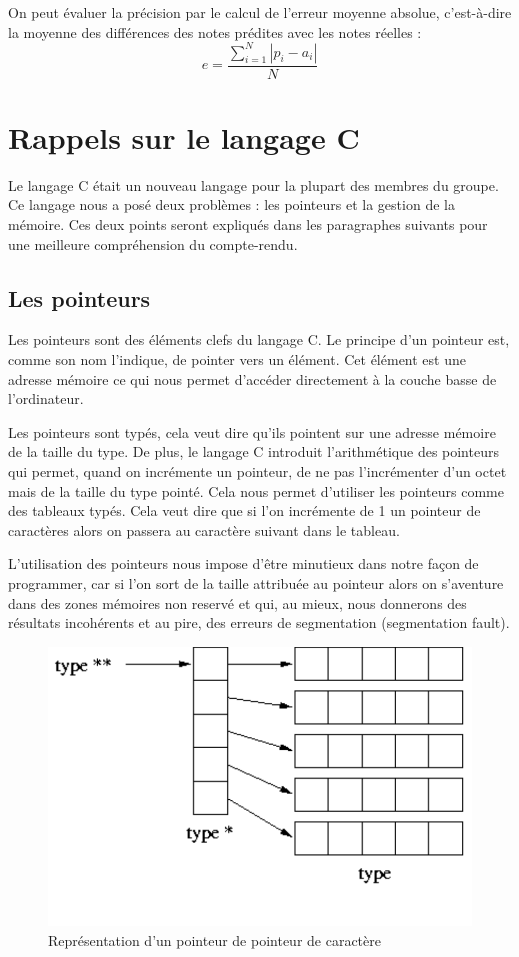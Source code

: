 \documentclass{article}
\begin{document}
    On peut évaluer la précision par le calcul de l'erreur moyenne absolue\cite{diapo2}, c'est-à-dire la moyenne des différences des notes prédites avec les notes réelles : 
    \[e = \frac{\sum_{i=1}^{N}|p_i-a_i|}{N}\]


\newpage




\section{Rappels sur le langage C}
    Le langage C était un nouveau langage pour la plupart des membres du groupe. Ce langage nous a posé deux problèmes : les pointeurs et la gestion de la mémoire. Ces deux points seront expliqués dans les paragraphes suivants pour une meilleure compréhension du compte-rendu.\\
\subsection{Les pointeurs}
    Les pointeurs sont des éléments clefs du langage C. Le principe d'un pointeur est, comme son nom l'indique, de pointer vers un élément. Cet élément est une adresse mémoire ce qui nous permet d'accéder directement à la couche basse de l'ordinateur.
    \par Les pointeurs sont typés, cela veut dire qu'ils pointent sur une adresse mémoire de la taille du type. De plus, le langage C introduit l'arithmétique des pointeurs qui permet, quand on incrémente un pointeur, de ne pas l'incrémenter d'un octet mais de la taille du type pointé. Cela nous permet d'utiliser les pointeurs comme des tableaux typés. Cela veut dire que si l'on incrémente de 1 un pointeur de caractères alors on passera au caractère suivant dans le tableau.
    \par L'utilisation des pointeurs nous impose d'être minutieux dans notre façon de programmer, car si l'on sort de la taille attribuée au pointeur alors on s'aventure dans des zones mémoires non reservé et qui, au mieux, nous donnerons des résultats incohérents et au pire, des erreurs de segmentation (segmentation fault).
    
    \begin{figure}[!h]
    \centering
    \includegraphics[scale=0.7]{Tableau.pdf}
    \caption{Représentation d'un pointeur de pointeur de caractère}
    \label{fig:my_label}
    \end{figure}
\end{document}
